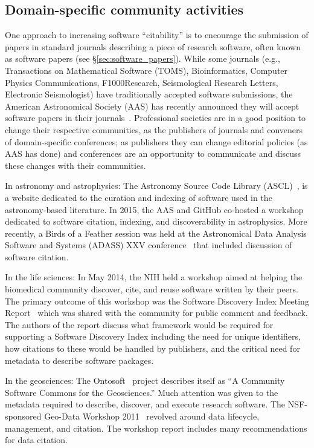 \documentclass[12pt, oneside]{amsart}
\begin{document}
\subsection{Domain-specific community activities}

One approach to increasing software ``citability'' is to encourage the
submission of papers in standard journals describing a piece of research
software, often known as software papers (see \S\ref{sec:software_papers}).
While some journals (e.g., Transactions on Mathematical Software (TOMS),
Bioinformatics, Computer Physics Communications, F1000Research,
Seismological Research Letters, Electronic Seismologist) have
traditionally accepted software submissions, the American Astronomical Society
(AAS) has recently announced they will accept software papers in their
journals~\cite{aas-sofware-papers}. Professional societies are in a good
position to change their respective communities, as the publishers of journals
and conveners of domain-specific conferences; as publishers they can change
editorial policies (as AAS has done) and conferences are an opportunity to
communicate and discuss these changes with their communities.

In astronomy and astrophysics: The Astronomy Source Code Library
(ASCL)~\cite{ascl}, is a website dedicated to the curation and indexing of
software used in the astronomy-based literature. In 2015, the AAS and GitHub
co-hosted a workshop~\cite{aas-software-index} dedicated to software citation,
indexing, and discoverability in astrophysics. More recently, a Birds of a Feather session was
held at the Astronomical Data Analysis Software and Systems (ADASS) XXV
conference~\cite{Allen:2015ub} that included discussion of software
citation.

In the life sciences: In May 2014, the NIH held a workshop aimed at helping the
biomedical community discover, cite, and reuse software written by their peers.
The primary outcome of this workshop was the Software Discovery Index Meeting
Report~\cite{software-discovery-index} which was shared with the community for
public comment and feedback. The authors of the report discuss
what framework would be required for supporting a Software Discovery Index
including the need for unique identifiers, how citations to these would be
handled by publishers, and the critical need for metadata to describe software
packages.

In the geosciences: The Ontosoft~\cite{ontosoft} project describes itself as ``A
Community Software Commons for the Geosciences.'' Much attention was given to the
metadata required to describe, discover, and execute research software. The NSF-sponsored
Geo-Data Workshop 2011~\cite{nsf-geo-data} revolved around data lifecycle, management, and
citation. The workshop report includes many recommendations for data
citation.
\end{document}
